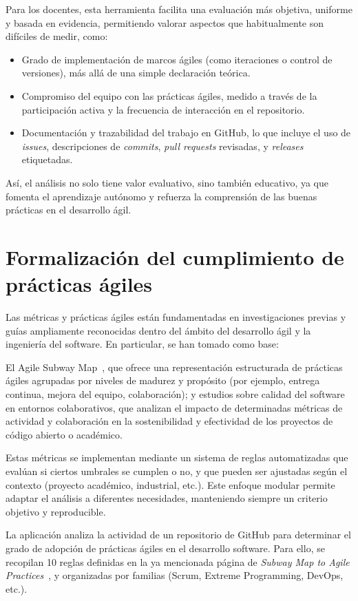 Para los docentes, esta herramienta facilita una evaluación más objetiva, uniforme y basada en evidencia, permitiendo valorar aspectos que habitualmente son difíciles de medir, como:

\begin{itemize}
\item Grado de implementación de marcos ágiles (como iteraciones o control de versiones), más allá de una simple declaración teórica.
\item Compromiso del equipo con las prácticas ágiles, medido a través de la participación activa y la frecuencia de interacción en el repositorio.
\item Documentación y trazabilidad del trabajo en GitHub, lo que incluye el uso de \textit{issues}, descripciones de \textit{commits}, \textit{pull requests} revisadas, y \textit{releases} etiquetadas.
\end{itemize}

Así, el análisis no solo tiene valor evaluativo, sino también educativo, ya que fomenta el aprendizaje autónomo y refuerza la comprensión de las buenas prácticas en el desarrollo ágil.

\section{Formalización del cumplimiento de prácticas ágiles}

Las métricas y prácticas ágiles están fundamentadas en investigaciones previas y guías ampliamente reconocidas dentro del ámbito del desarrollo ágil y la ingeniería del software. En particular, se han tomado como base:

El Agile Subway Map~\cite{agileSubwayMap}, que ofrece una representación estructurada de prácticas ágiles agrupadas por niveles de madurez y propósito (por ejemplo, entrega continua, mejora del equipo, colaboración); y estudios sobre calidad del software en entornos colaborativos, que analizan el impacto de determinadas métricas de actividad y colaboración en la sostenibilidad y efectividad de los proyectos de código abierto o académico.

Estas métricas se implementan mediante un sistema de reglas automatizadas que evalúan si ciertos umbrales se cumplen o no, y que pueden ser ajustadas según el contexto (proyecto académico, industrial, etc.). Este enfoque modular permite adaptar el análisis a diferentes necesidades, manteniendo siempre un criterio objetivo y reproducible.

La aplicación analiza la actividad de un repositorio de GitHub para determinar el grado de adopción de prácticas ágiles en el desarrollo software. Para ello, se recopilan 10 reglas definidas en la ya mencionada página de \textit{Subway Map to Agile Practices}~\cite{agileSubwayMap}, y organizadas por familias (Scrum, Extreme Programming, DevOps, etc.).

